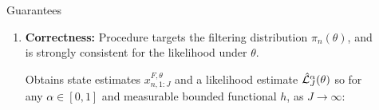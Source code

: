 \documentclass[final]{beamer}
\newcommand{\off}{\operatorname{off}}
\newcommand{\on}{\operatorname{on}}
\newcommand{\gX}{\mathcal{X}}
\newlength{\sepwidth}
\newlength{\colwidth}
\newcommand{\separatorcolumn}{\begin{column}{\sepwidth}\end{column}}
\begin{document}
\begin{frame}[t]
\begin{columns}[t]
\begin{column}{\colwidth}
    


\end{column}


\separatorcolumn

\begin{column}{\colwidth}

  \begin{alertblock}{Guarantees}
    \begin{enumerate}
        \item \textbf{Correctness:} Procedure targets the filtering distribution $\pi_n(\theta)$, and is strongly consistent for the likelihood under $\theta$.\footnotemark[1]
        
        Obtains state estimates $x_{n,1:J}^{F,\theta}$ and a likelihood estimate $\hat {\mathcal{L}}_J^\alpha(\theta)$ so for any $\alpha\in[0,1]$ and measurable bounded functional $h$, as $J \to \infty$:
        

\end{enumerate}
\end{alertblock}
\end{column}
\end{columns}
\end{frame}
\end{document}
